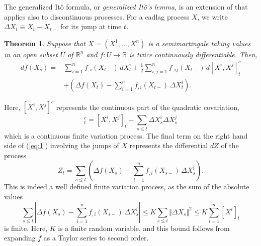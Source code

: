 \documentclass[12pt]{article}
\newtheorem*{theorem*}{Theorem}
\begin{document}

The generalized It\^o formula, or \emph{generalized It\^o's lemma}, is an extension of  that applies also to discontinuous processes. For a cadlag process $X$, we write $\Delta X_t\equiv X_t-X_{t-}$ for its jump at time $t$.

\begin{theorem*}
Suppose that $X=(X^1,\ldots,X^n)$ is a semimartingale taking values in an open subset $U$ of $\mathbb{R}^n$ and $f\colon U\rightarrow\mathbb{R}$ is twice continuously differentiable. Then,
\begin{equation}\label{eq:1}\begin{split}
df(X_s)=&\sum_{i=1}^n f_{,i}(X_{t-})\,dX^i_t + \frac{1}{2}\sum_{i,j=1}^nf_{,ij}(X_{t-})\,d[X^i,X^j]^c_t\\
& + \left(\Delta f(X_t)-\sum_{i=1}^n f_{,i}(X_{t-})\,\Delta X^i_t\right).
\end{split}\end{equation}
\end{theorem*}

Here, $[X^i,X^j]^c$ represents the continuous part of the quadratic covariation,
\begin{equation*}
[X^i,X^j]^c_t=[X^i,X^j]_t-\sum_{s\le t}\Delta X^i_s\Delta X^j_s
\end{equation*}
which is a continuous finite variation process.
The final term on the right hand side of (\ref{eq:1}) involving the jumps of $X$ represents the differential $dZ$ of the process
\begin{equation*}
Z_t=\sum_{s\le t}\left(\Delta f(X_s)-\sum_{i=1}^n f_{,i}(X_{s-})\,\Delta X^i_s\right).
\end{equation*}
This is indeed a well defined finite variation process, as the sum of the absolute values
\begin{equation*}
\sum_{s\le t}\left|\Delta f(X_s)-\sum_{i=1}^n f_{,i}(X_{s-})\,\Delta X^i_s\right|
\le K\sum_{s\le t}\Vert \Delta X_s\Vert^2\le K\sum_{i=1}^n [X^i]_t
\end{equation*}
is finite. Here, $K$ is a finite random variable, and this bound follows from expanding $f$ as a Taylor series to second order.
\end{document}

